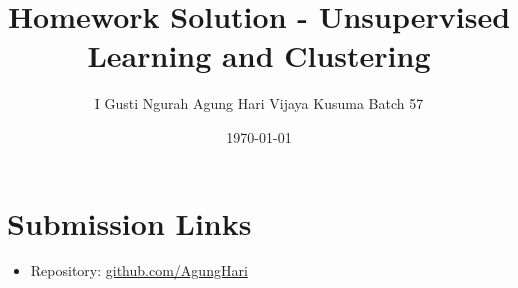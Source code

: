 \documentclass[12pt]{article}
\title{Homework Solution - Unsupervised Learning and Clustering}
\author{I Gusti Ngurah Agung Hari Vijaya Kusuma Batch 57}
\date{\today}
\begin{document}
\maketitle

\section*{Submission Links}
\begin{itemize}
  \item Repository: \href{https://github.com/AgungHari/Rakamin_HW_MachineLearning_SupervisedLearning}{github.com/AgungHari}
\end{itemize}






\end{document}
